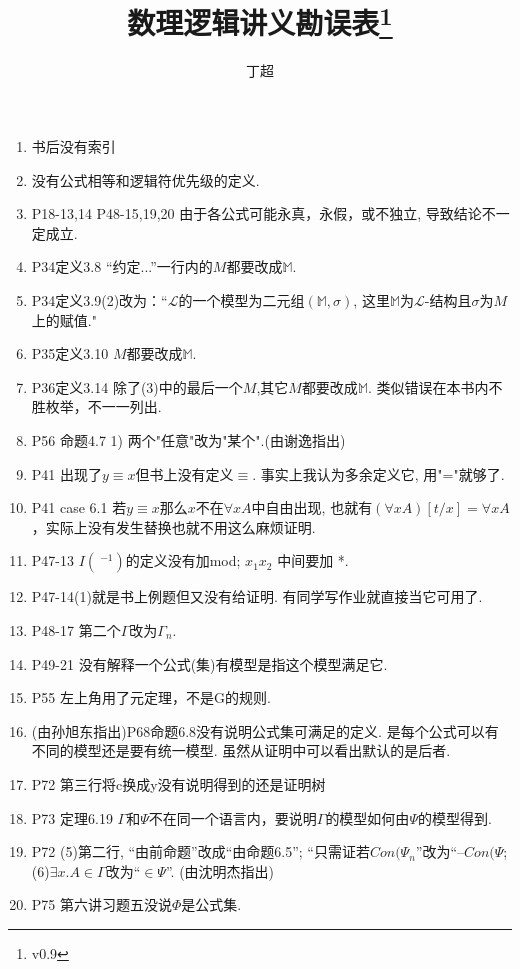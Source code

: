 \documentclass{article}
\begin{document}
\title{数理逻辑讲义勘误表\footnote{v0.9}}
\author{丁超}
\maketitle	
\begin{enumerate}
\item 书后没有索引
\item 没有公式相等和逻辑符优先级的定义. 
\item P18-13,14 P48-15,19,20 由于各公式可能永真，永假，或不独立, 导致结论不一定成立. 
\item P34定义3.8 “约定...”一行内的$M$都要改成$\mathbb{M}$. 
\item P34定义3.9(2)改为：“$\mathscr{L}$的一个模型为二元组$(\mathbb{M},\sigma)$, 这里$\mathbb{M}$为$\mathscr{L}$-结构且$\sigma$为$M$上的赋值."
\item P35定义3.10 $M$都要改成$\mathbb{M}$. 
\item P36定义3.14 除了(3)中的最后一个$M$,其它$M$都要改成$\mathbb{M}$. 类似错误在本书内不胜枚举，不一一列出. 
\item P56 命题4.7 1) 两个"任意"改为"某个".(由谢逸指出)
\item P41 出现了$y\equiv x$但书上没有定义$\equiv$. 事实上我认为多余定义它, 用"="就够了. 
\item P41 case 6.1 若$y\equiv x$那么$x$不在$\forall xA$中自由出现, 也就有$(\forall xA)[t/x] = \forall xA$，实际上没有发生替换也就不用这么麻烦证明. 
\item P47-13 $I(~^{-1})$的定义没有加mod; $x_1x_2$ 中间要加 *. 
\item P47-14(1)就是书上例题但又没有给证明. 有同学写作业就直接当它可用了. 
\item P48-17 第二个$\Gamma$改为$\Gamma_n$. 
\item P49-21 没有解释一个公式(集)有模型是指这个模型满足它. 
\item P55 左上角用了元定理，不是G的规则. 
\item (由孙旭东指出)P68命题6.8没有说明公式集可满足的定义. 是每个公式可以有不同的模型还是要有统一模型. 虽然从证明中可以看出默认的是后者. 
\item P72 第三行将c换成y没有说明得到的还是证明树
\item P73 定理6.19 $\Gamma$和$\Psi$不在同一个语言内，要说明$\Gamma$的模型如何由$\Psi$的模型得到. 
\item P72 (5)第二行, ``由前命题''改成``由命题6.5''; ``只需证若$Con(\Psi_n$''改为``--$Con(\Psi$; (6)$\exists x.A \in \Gamma$改为``$\in \Psi$''. (由沈明杰指出)
\item P75 第六讲习题五没说$\Phi$是公式集. 

\end{enumerate}
\end{document}
